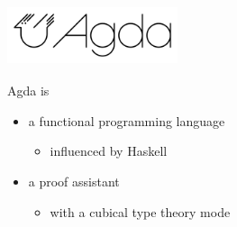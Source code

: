 \documentclass[aspectratio=1610]{beamer}
\begin{document}
\begin{frame}
  \frametitle{\includegraphics[width=5cm]{./images/agda-logo.png}}

  Agda is
  \begin{itemize}
    \item
      a functional programming language
      \begin{itemize}
        \item
          influenced by Haskell
      \end{itemize}
    \item
      a proof assistant
      \begin{itemize}
        \item
          with a \alert{cubical type theory} mode
      \end{itemize}
  \end{itemize}
\end{frame}
\end{document}
